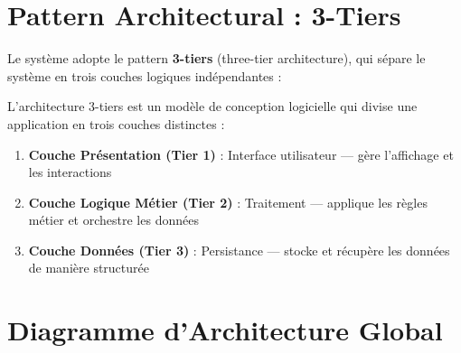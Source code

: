 \documentclass[12pt,a4paper]{report}
\begin{document}
\section{Pattern Architectural : 3-Tiers}

Le système adopte le pattern \textbf{3-tiers} (three-tier architecture), qui sépare le système en trois couches logiques indépendantes :

\begin{tcolorbox}[infobox, title=Définition — Architecture 3-Tiers]
L'architecture 3-tiers est un modèle de conception logicielle qui divise une application en trois couches distinctes :
\begin{enumerate}
    \item \textbf{Couche Présentation (Tier 1)} : Interface utilisateur — gère l'affichage et les interactions
    \item \textbf{Couche Logique Métier (Tier 2)} : Traitement — applique les règles métier et orchestre les données
    \item \textbf{Couche Données (Tier 3)} : Persistance — stocke et récupère les données de manière structurée
\end{enumerate}
\end{tcolorbox}

\section{Diagramme d'Architecture Global}
\end{document}

